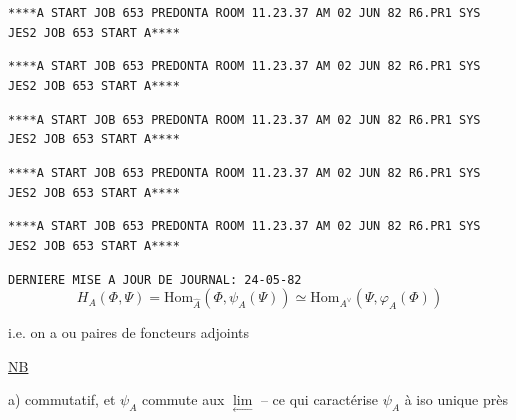 \texttt{****A START JOB 653 PREDONTA ROOM 11.23.37 AM 02 JUN 82 R6.PR1 SYS JES2 JOB 653 START A****}

\texttt{****A START JOB 653 PREDONTA ROOM 11.23.37 AM 02 JUN 82 R6.PR1 SYS JES2 JOB 653 START A****}

\texttt{****A START JOB 653 PREDONTA ROOM 11.23.37 AM 02 JUN 82 R6.PR1 SYS JES2 JOB 653 START A****}

\texttt{****A START JOB 653 PREDONTA ROOM 11.23.37 AM 02 JUN 82 R6.PR1 SYS JES2 JOB 653 START A****}

\texttt{****A START JOB 653 PREDONTA ROOM 11.23.37 AM 02 JUN 82 R6.PR1 SYS JES2 JOB 653 START A****}

\texttt{DERNIERE MISE A JOUR DE JOURNAL: 24-05-82}
\[
\boxed{H_A(\Phi,\Psi)=\mathrm{Hom}_{\widehat A}(\Phi,\psi_A(\Psi))\simeq\mathrm{Hom}_{A^\vee}(\Psi,\varphi_A(\Phi))}
\]

i.e. on a
ou
paires de foncteurs adjoints

\uline{NB}

a) 
commutatif, et $\psi_A$ commute aux $\underset{\leftarrow}{\lim}$
-- ce qui caractérise $\psi_A$ à iso unique près

